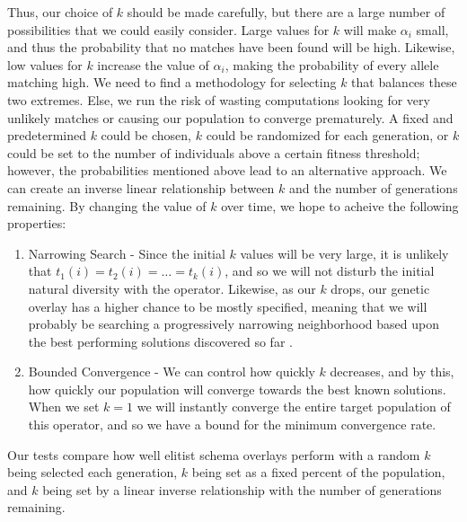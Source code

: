 Thus, our choice of $k$ should be made carefully, but there are a large number of possibilities that we could easily consider. Large values for $k$ will make $\alpha_i$ small, and thus the probability that no matches have been found will be high. Likewise, low values for $k$ increase the value of $\alpha_i$, making the probability of every allele matching high. We need to find a methodology for selecting $k$ that balances these two extremes. Else, we run the risk of wasting computations looking for very unlikely matches or causing our population to converge prematurely. A fixed and predetermined $k$ could be chosen, $k$ could be randomized for each generation, or $k$ could be set to the number of individuals above a certain fitness threshold; however, the probabilities mentioned above lead to an alternative approach. We can create an inverse linear relationship between $k$ and the number of generations remaining. By changing the value of $k$ over time, we hope to acheive the following properties:

\begin{enumerate}

\item Narrowing Search - Since the initial $k$ values will be very large, it is unlikely that $t_1(i) = t_2(i) = \ldots = t_k(i)$, and so we will not disturb the initial natural diversity with the operator.  Likewise, as our $k$ drops, our genetic overlay has a higher chance to be mostly specified, meaning that we will probably be searching a progressively narrowing neighborhood based upon the best performing solutions discovered so far \cite{Neri11}.

\item Bounded Convergence - We can control how quickly $k$ decreases, and by this, how quickly our population will converge towards the best known solutions. When we set $k=1$ we will instantly converge the entire target population of this operator, and so we have a bound for the minimum convergence rate.

\end{enumerate}

Our tests compare how well elitist schema overlays perform with a random $k$ being selected each generation, $k$ being set as a fixed percent of the population, and $k$ being set by a linear inverse relationship with the number of generations remaining.

%
%
%

